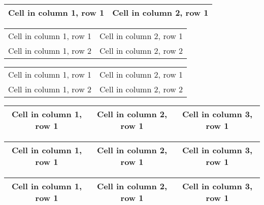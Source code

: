 \begin{center}
\begin{tabular}{|c|c|}
\hline
Cell in column 1, row 1 & Cell in column 2, row 1 \\
\hline
\end{tabular}
\end{center}

\begin{center}
\begin{tabular}{|c|c|}
\hline
Cell in column 1, row 1 & Cell in column 2, row 1 \\
Cell in column 1, row 2 & Cell in column 2, row 2 \\
\hline
\end{tabular}
\end{center}

\begin{center}
\begin{tabular}{|c|c|}
\hline
Cell in column 1, row 1 & Cell in column 2, row 1 \\
Cell in column 1, row 2 & Cell in column 2, row 2 \\
\hline
\end{tabular}
\end{center}

\begin{center}
\begin{tabular}{|c|c|c|}
\hline
Cell in column 1, row 1 & Cell in column 2, row 1 & Cell in column 3, row 1 \\
\hline
\end{tabular}
\end{center}

\begin{center}
\begin{tabular}{|c|c|c|}
\hline
Cell in column 1, row 1 & Cell in column 2, row 1 & Cell in column 3, row 1 \\
\hline
\end{tabular}
\end{center}

\begin{center}
\begin{tabular}{|c|c|c|}
\hline
Cell in column 1, row 1 & Cell in column 2, row 1 & Cell in column 3, row 1 \\
\hline
\end{tabular}
\end{center}

